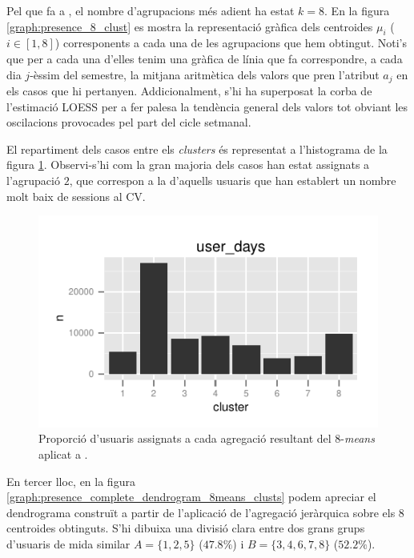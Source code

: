 \documentclass[
	a4paper,
	twoside,
	justified
]{tufte-book}
\begin{document}
Pel que fa a , el nombre d'agrupacions més adient ha estat $k = 8$. En la figura \ref{graph:presence_8_clust} es mostra la representació gràfica dels centroides $\mu_i$ ($i \in [1,8]$) corresponents a cada una de les agrupacions que hem obtingut. Noti's que per a cada una d'elles tenim una gràfica de línia que fa correspondre, a cada dia $j$-èssim del semestre, la mitjana aritmètica dels valors que pren l'atribut $a_j$ en els casos que hi pertanyen. Addicionalment, s'hi ha superposat la corba de l'estimació LOESS per a fer palesa la tendència general dels valors tot obviant les oscilacions provocades pel part del cicle setmanal.      

El repartiment dels casos entre els \emph{clusters} és representat a l'histograma de la figura \ref{graph:user_presence_8means_clusts}. Observi-s'hi com la gran majoria dels casos han estat assignats a l'agrupació $2$, que correspon a la d'aquells usuaris que han establert un nombre molt baix de sessions al CV.  

\begin{figure}
\begin{center}
\includegraphics{user_presence_8means_clusts}
\caption{
\label{graph:user_presence_8means_clusts}
	Proporció d'usuaris assignats a cada agregació resultant del 8-\emph{means} aplicat a . 
}
\end{center}
\end{figure}

En tercer lloc, en la figura \ref{graph:presence_complete_dendrogram_8means_clusts} podem apreciar el dendrograma construït a partir de l'aplicació de l'agregació jeràrquica sobre els $8$ centroides obtinguts. S'hi dibuixa una divisió clara entre dos grans grups d'usuaris de mida similar $A = \{1,2,5\}$ ($47.8\%$) i $B = \{3,4,6,7,8\}$ ($52.2\%$).
\end{document}
